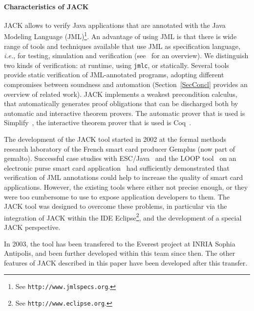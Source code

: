 \paragraph{Characteristics of JACK}
JACK allows to verify Java applications that are annotated with the
Java Modeling Language (JML)\footnote{See
\texttt{http://www.jmlspecs.org}.}. An advantage of using JML is that
there is wide range of tools and techniques available that use JML as
specification language, 
\emph{i.e.}, for testing, simulation and verification 
(see~\cite{BurdyCCEKLLP03} for an overview). We distinguish two kinds
of verification: at runtime, using
\texttt{jmlc}, or statically. Several tools provide
static verification of JML-annotated programs, adopting different
compromises between soundness and automation (Section~\ref{SecConcl}
provides an overview of related work).  JACK implements a weakest
precondition calculus, that automatically generates proof obligations
that can be discharged both by automatic and interactive theorem
provers. The automatic prover that is used is
Simplify~\cite{DetlefsNS05}, the interactive theorem prover that is
used is Coq~\cite{CoqManualV81}.


The development of the JACK tool started in 2002 at the formal methods
research laboratory of the French smart card producer Gemplus (now
part of gemalto). Successful case studies with ESC/Java~\cite{CokK04}
and the LOOP tool~\cite{BergJ01} on an electronic purse smart card
application~\cite{final:Form.Met} had sufficiently demonstrated that
verification of JML annotations could help to increase the quality of
smart card applications. However, the existing tools where either not
precise enough, or they were too cumbersome to use to expose
application developers to them. The JACK tool was designed to overcome
these problems, in particular via the integration of JACK within the
IDE Eclipse\footnote{See \texttt{http://www.eclipse.org}.}, and the
development of a special JACK perspective.

In 2003, the tool has been transfered to the Everest project at INRIA
Sophia Antipolis, and been further developed within this team since
then. The other features of JACK described in this paper have been
developed after this transfer.

